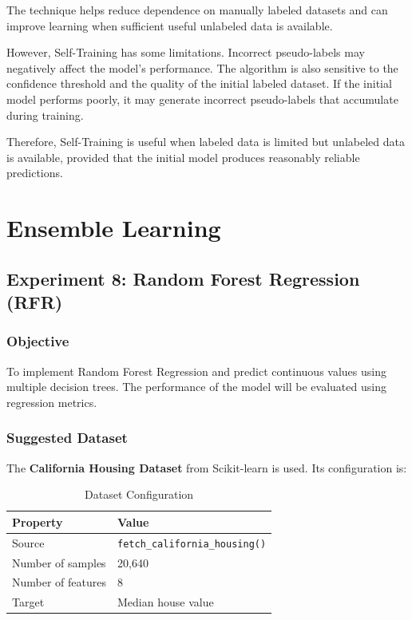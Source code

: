 \documentclass[a4paper,11pt]{article}
\begin{document}
The technique helps reduce dependence on manually labeled datasets and can improve learning when sufficient useful unlabeled data is available.

However, Self-Training has some limitations. Incorrect pseudo-labels may negatively affect the model's performance. The algorithm is also sensitive to the confidence threshold and the quality of the initial labeled dataset. If the initial model performs poorly, it may generate incorrect pseudo-labels that accumulate during training.

Therefore, Self-Training is useful when labeled data is limited but unlabeled data is available, provided that the initial model produces reasonably reliable predictions.


\section{Ensemble Learning}

\subsection{Experiment 8: Random Forest Regression (RFR)}

\subsubsection{Objective}
To implement Random Forest Regression and predict continuous values using multiple decision trees. The performance of the model will be evaluated using regression metrics.

\subsubsection{Suggested Dataset}
The \textbf{California Housing Dataset} from Scikit-learn is used. Its configuration is:

\begin{table}[H]
\centering
\caption{Dataset Configuration}
\begin{tabular}{ll}
\toprule
\textbf{Property} & \textbf{Value} \\
\midrule
Source             & \texttt{fetch\_california\_housing()} \\
Number of samples  & 20{,}640 \\
Number of features & 8 \\
Target             & Median house value \\
\bottomrule
\end{tabular}
\end{table}
\end{document}
